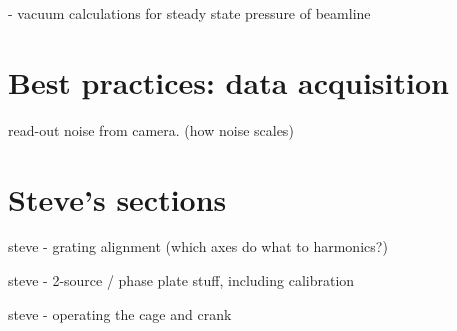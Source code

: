 - vacuum calculations for steady state pressure of beamline

\section{Best practices: data acquisition}

read-out noise from camera. (how noise scales)

\section{Steve's sections}
steve - grating alignment (which axes do what to harmonics?)

steve - 2-source / phase plate stuff, including calibration

steve - operating the cage and crank